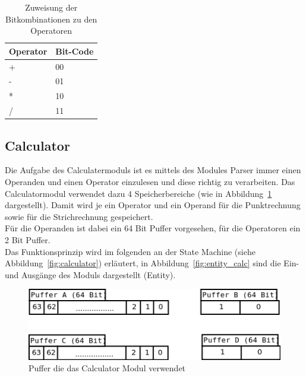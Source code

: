 \begin{table}[!h]
\begin{center}
\begin{tabular}{|l|l|}
\hline
Operator & Bit-Code\\
\hline
\hline

+ & 00 \\
- & 01 \\
* & 10 \\
/ & 11 \\
\hline

\end{tabular}
\end{center}
\label{tab:operator_code}
\caption{Zuweisung der Bitkombinationen zu den Operatoren} 
\end{table}

\subsection{Calculator}

Die Aufgabe des Calculatermoduls ist es mittels des Modules Parser immer einen Operanden und einen Operator einzulesen und diese richtig zu verarbeiten. Das Calculatormodul verwendet dazu 4 Speicherbereiche (wie in Abbildung~\ref{fig:vier_puffer} dargestellt). Damit wird je ein Operator und ein Operand für die Punktrechnung sowie für die Strichrechnung gespeichert.\\
Für die Operanden ist dabei ein 64 Bit Puffer vorgesehen, für die Operatoren ein 2 Bit Puffer.\\
Das Funktionsprinzip wird im folgenden an der State Machine (siehe Abbildung~\ref{fig:calculator}) erläutert, in Abbildung~\ref{fig:entity_calc} sind die Ein- und Ausgänge des Moduls dargestellt (Entity).

\begin{figure}[!ht]
	\centering
	\includegraphics[scale=0.5]{figures/vier_puffer.png} 
	\caption{Puffer die das Calculator Modul verwendet}
	\label{fig:vier_puffer}
\end{figure}

